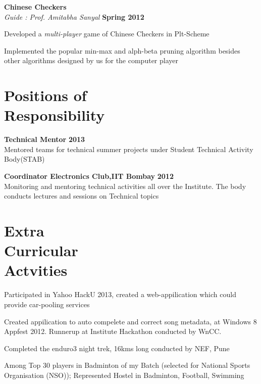 \documentclass[margin,11pt]{resume}
\begin{document}
\begin{resume}
    \textbf{Chinese Checkers}\vspace{1mm} \hfill\\
		\textsl{Guide : Prof. Amitabha Sanyal} \hfill \textbf{Spring 2012} \vspace{-5mm}\\
				\begin{list2}
                    \item Developed a \emph{multi-player} game of Chinese Checkers in Plt-Scheme
                    \item Implemented the popular min-max and alph-beta pruning algorithm besides other algorithms designed by us for the computer player
				\end{list2} \vspace{-2.75mm} 

\section{\mysidestyle Positions of\\ Responsibility}

\begin{list2}
\item \textbf{Technical Mentor} \hfill\textbf{2013}\\
				Mentored teams for technical summer projects under Student Technical Activity Body(STAB)
\item \textbf{Coordinator Electronics Club,IIT Bombay} \hfill \textbf{2012}\\
				Monitoring and mentoring technical activities all over the Institute. The body conducts lectures and sessions on Technical topics
\end{list2}

\vspace{-1mm}
\section{\mysidestyle Extra\\Curricular\\Actvities}
\begin{list2}
\item Participated in  Yahoo HackU  2013, created a web-appilication which could provide car-pooling services
\item Created appilication to  auto compelete and correct song metadata, at Windows 8 Appfest 2012. Runnerup at Institute Hackathon conducted by WnCC.			
\item Completed the enduro3 night trek, 16kms long conducted by NEF, Pune
\item Among Top 30 players in Badminton of my Batch (selected for National Sports Organisation (NSO)); Represented Hostel in Badminton, Football, Swimming
\end{list2}


\end{resume}
\end{document}
